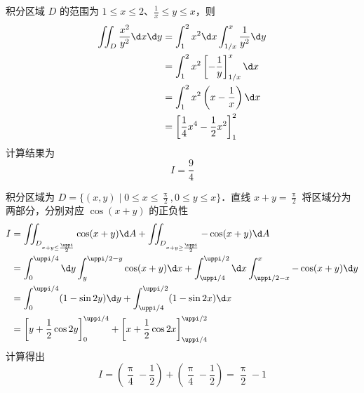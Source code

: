 \begin{solution}

    积分区域 $D$ 的范围为 $1 \le x \le 2$、$\frac{1}{x} \le y \le x$，则
    \begin{equation}
        \begin{aligned}
            \iint_{D} \frac{x^{2}}{y^{2}} \d x \d y & = \int_{1}^{2} x^{2} \d x \int_{1 / x}^{x} \frac{1}{y^{2}} \d y   \\
                                                    & = \int_{1}^{2} x^{2} \left[ -\frac{1}{y} \right]_{1 / x}^{x} \d x \\
                                                    & = \int_{1}^{2} x^{2} \left( x - \frac{1}{x} \right) \d x          \\
                                                    & = \left[ \frac{1}{4} x^{4} - \frac{1}{2} x^{2} \right]_{1}^{2}
        \end{aligned}
    \end{equation}
    计算结果为
    \begin{equation}
        I = \boxed{\frac{9}{4}}
    \end{equation}


    积分区域为 $D = \{ (x, y) \mid 0 \le x \le \frac{\uppi}{2}, 0 \le y \le x \}$．直线 $x+y = \frac{\uppi}{2}$ 将区域分为两部分，分别对应 $\cos(x+y)$ 的正负性
    \begin{equation}
        \begin{aligned}
            I & = \iint_{D_{x+y \le \frac{\uppi}{2}}} \cos (x+y) \d A + \iint_{D_{x+y \ge \frac{\uppi}{2}}} -\cos (x+y) \d A                         \\
              & = \int_{0}^{\uppi/4} \d y \int_{y}^{\uppi/2-y} \cos (x+y) \d x + \int_{\uppi/4}^{\uppi/2} \d x \int_{\uppi/2-x}^{x} -\cos (x+y) \d y \\
              & = \int_{0}^{\uppi/4} (1 - \sin 2y) \d y + \int_{\uppi/4}^{\uppi/2} (1 - \sin 2x) \d x                                                \\
              & = \left[ y + \frac{1}{2} \cos 2y \right]_{0}^{\uppi/4} + \left[ x + \frac{1}{2} \cos 2x \right]_{\uppi/4}^{\uppi/2}
        \end{aligned}
    \end{equation}
    计算得出
    \begin{equation}
        I = \left( \frac{\uppi}{4} - \frac{1}{2} \right) + \left( \frac{\uppi}{4} - \frac{1}{2} \right) = \boxed{\frac{\uppi}{2}-1}
    \end{equation}
\end{solution}



